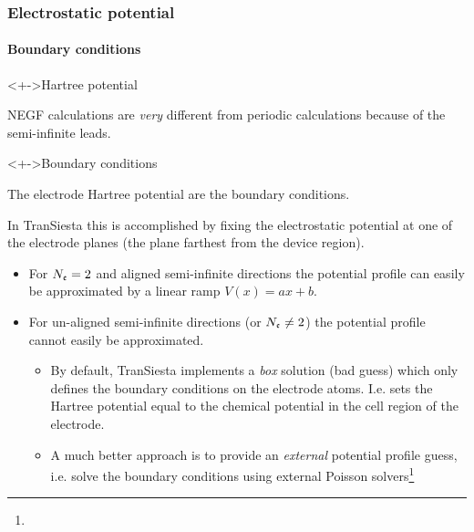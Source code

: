 \begin{frame}
{\begin{center}

  \end{center}}

\end{frame}


\begin{frame}
  \frametitle{Electrostatic potential}
  \framesubtitle{Boundary conditions}

  \begin{block}<+->{Hartree potential}

    NEGF calculations are \emph{very} different from periodic calculations because of the
    semi-infinite leads.

  \end{block}

  \begin{block}<+->{Boundary conditions}

    The electrode Hartree potential are the boundary conditions.

    In TranSiesta this is accomplished by fixing the electrostatic potential at one of the
    electrode planes (the plane farthest from the device region).

    \begin{itemize}
      \item For $N_{\mathfrak{e}}=2$ and aligned semi-infinite directions the potential profile can
      easily be approximated by a linear ramp $V(x) = ax+b$.

      \item For un-aligned semi-infinite directions (or $N_{\mathfrak{e}}\neq2$) the potential
      profile cannot easily be approximated.

      \begin{itemize}[<+->]
        \item By default, TranSiesta implements a \emph{box} solution (bad guess) which
        only defines the boundary conditions on the electrode atoms. I.e. sets the Hartree
        potential equal to the chemical potential in the cell region of the electrode.

        \item A much better approach is to provide an \emph{external} potential profile
        guess, i.e. solve the boundary conditions using external Poisson
        solvers\footnote{}


\end{itemize}
\end{itemize}
\end{block}
\end{frame}
